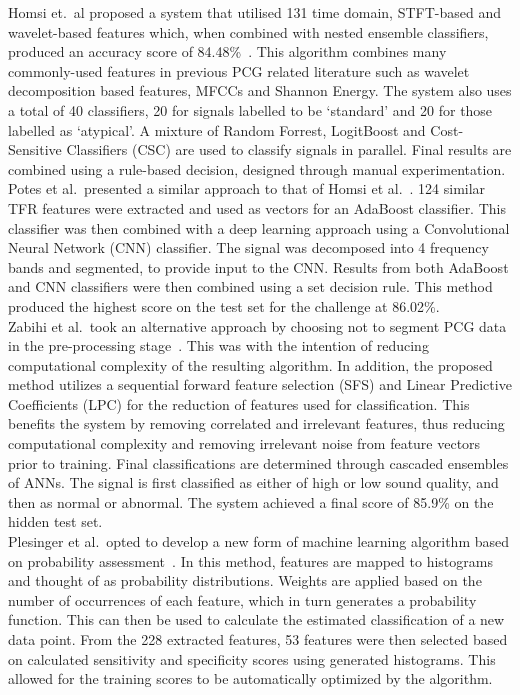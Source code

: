 \documentclass[titlepage, 12pt]{scrartcl} \usepackage{enumitem}
\begin{document}
Homsi et.\ al proposed a system that utilised 131 time domain, STFT-based and
wavelet-based features which, when combined with nested ensemble classifiers,
produced an accuracy score of 84.48\%~\parencite{Homsi2017}. This algorithm
combines many commonly-used features in previous PCG related literature such as
wavelet decomposition based features, MFCCs and Shannon Energy. The system also
uses a total of 40 classifiers, 20 for signals labelled to be `standard' and 20
for those labelled as `atypical'. A mixture of Random Forrest, LogitBoost and
Cost-Sensitive Classifiers (CSC) are used to classify signals in parallel.
Final results are combined using a rule-based decision, designed through manual
experimentation.\\

Potes et al.\ presented a similar approach to that of Homsi et
al.~\parencite{Potes2016}. 124 similar TFR features were extracted and used as
vectors for an AdaBoost classifier. This classifier was then combined with a
deep learning approach using a Convolutional Neural Network (CNN) classifier.
The signal was decomposed into 4 frequency bands and segmented, to provide
input to the CNN. Results from both AdaBoost and CNN classifiers were then
combined using a set decision rule.  This method produced the highest score on
the test set for the challenge at 86.02\%.\\

Zabihi et al.\ took an alternative approach by choosing not to segment PCG data
in the pre-processing stage~\parencite{Zabihi2016}. This was with the intention
of reducing computational complexity of the resulting algorithm. In addition,
the proposed method utilizes a sequential forward feature selection (SFS) and
Linear Predictive Coefficients (LPC) for the reduction of features used for
classification. This benefits the system by removing correlated and irrelevant
features, thus reducing computational complexity and removing irrelevant noise
from feature vectors prior to training.  Final classifications are determined
through cascaded ensembles of ANNs. The signal is first classified as either of
high or low sound quality, and then as normal or abnormal. The system achieved
a final score of 85.9\% on the hidden test set.\\

Plesinger et al.\ opted to develop a new form of machine learning algorithm
based on probability assessment~\parencite{Plesinger2017}. In this method,
features are mapped to histograms and thought of as probability distributions.
Weights are applied based on the number of occurrences of each feature, which in
turn generates a probability function. This can then be used to calculate the
estimated classification of a new data point. From the 228 extracted features,
53 features were then selected based on calculated sensitivity and specificity
scores using generated histograms. This allowed for the training scores to be
automatically optimized by the algorithm.\\
\end{document}
